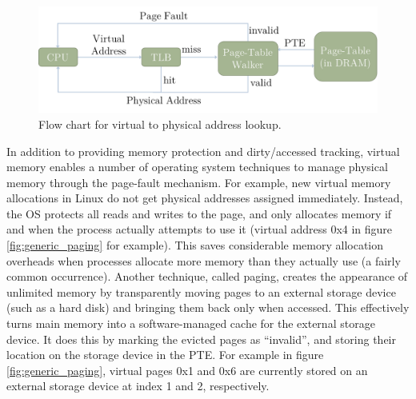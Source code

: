 \begin{figure}[h]
    \centering
    \includegraphics[width=0.9\columnwidth]{figs/generic_paging.pdf}
    \vspace{-5mm}
    \caption{Flow chart for virtual to physical address lookup.}
    \label{fig:generic_paging_flow}
\end{figure}

In addition to providing memory protection and dirty/accessed tracking, virtual
memory enables a number of operating system techniques to manage physical
memory through the page-fault mechanism. For example, new virtual memory
allocations in Linux do not get physical addresses assigned immediately.
Instead, the OS protects all reads and writes to the page, and only allocates
memory if and when the process actually attempts to use it (virtual address 0x4
in figure \ref{fig:generic_paging} for example). This saves considerable memory
allocation overheads when processes allocate more memory than they actually use
(a fairly common occurrence). Another technique, called paging, creates the
appearance of unlimited memory by transparently moving pages to an external
storage device (such as a hard disk) and bringing them back only when accessed.
This effectively turns main memory into a software-managed cache for the
external storage device. It does this by marking the evicted pages as
``invalid'', and storing their location on the storage device in the PTE. For
example in figure \ref{fig:generic_paging}, virtual pages 0x1 and 0x6 are
currently stored on an external storage device at index 1 and 2, respectively.
